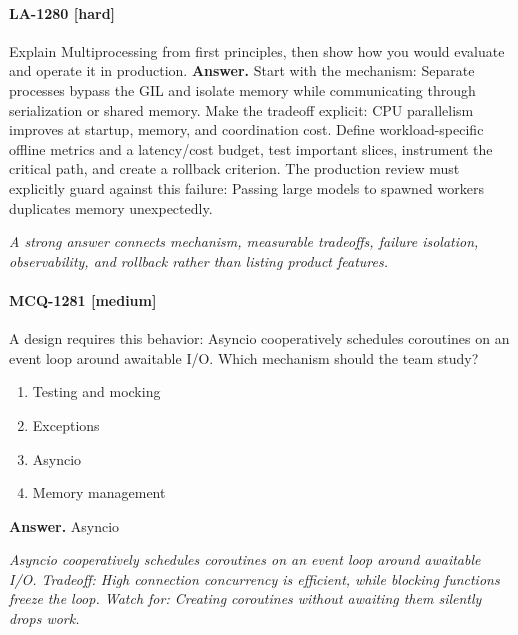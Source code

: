 \paragraph{LA-1280 [hard]} Explain Multiprocessing from first principles, then show how you would evaluate and operate it in production.
\noindent\textbf{Answer.} Start with the mechanism: Separate processes bypass the GIL and isolate memory while communicating through serialization or shared memory. Make the tradeoff explicit: CPU parallelism improves at startup, memory, and coordination cost. Define workload-specific offline metrics and a latency/cost budget, test important slices, instrument the critical path, and create a rollback criterion. The production review must explicitly guard against this failure: Passing large models to spawned workers duplicates memory unexpectedly.
\par\textit{A strong answer connects mechanism, measurable tradeoffs, failure isolation, observability, and rollback rather than listing product features.}
\paragraph{MCQ-1281 [medium]} A design requires this behavior: Asyncio cooperatively schedules coroutines on an event loop around awaitable I/O. Which mechanism should the team study?
\begin{enumerate}[label=\Alph*.]
\item Testing and mocking
\item Exceptions
\item Asyncio
\item Memory management
\end{enumerate}
\noindent\textbf{Answer.} Asyncio
\par\textit{Asyncio cooperatively schedules coroutines on an event loop around awaitable I/O. Tradeoff: High connection concurrency is efficient, while blocking functions freeze the loop. Watch for: Creating coroutines without awaiting them silently drops work.}
